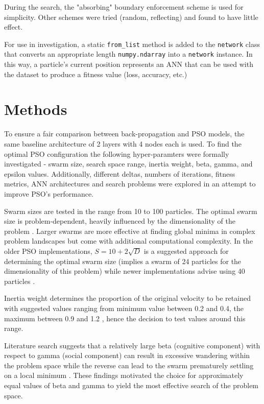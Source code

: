 \documentclass[12pt]{article}
\begin{document}
During the search, the "absorbing" \cite{Chu} boundary enforcement scheme is used
for simplicity. Other schemes were tried (random, reflecting) and found to have
little effect.

For use in investigation, a static \texttt{from\_list} method is added to
the \texttt{network} class that converts an appropriate length \texttt{numpy.ndarray}
into a \texttt{network} instance. In this way, a particle's current position
represents an ANN that can be used with the dataset to produce a fitness value (loss, accuracy, etc.)


\vspace{-1.5em}
\section{Methods}
\vspace{-1.5em}

To ensure a fair comparison between back-propagation and PSO models, the same baseline architecture of 2 layers with 4 nodes each is used. To find the optimal PSO configuration the following hyper-paramters were formally investigated - swarm size, search space range, inertia weight, beta, gamma, and epsilon values. Additionally, different deltas, numbers of iterations, fitness metrics, ANN architectures and search problems were explored in an attempt to improve PSO's performance.

Swarm sizes are tested in the range from 10 to 100 particles. The optimal swarm size is problem-dependent, heavily influenced by the dimensionality of the problem \cite{Razee}. Larger swarms are more effective at finding global minima in complex problem landscapes but come with additional computational complexity. In the older PSO implementations, \(S = 10 + 2\sqrt{D}\) is a suggested approach for determining the optimal swarm size (implies a swarm of 24 particles for the dimensionality of this problem) while newer implementations advise using 40 particles \cite{Clerc}.

Inertia weight determines the proportion of the original velocity to be retained with suggested values ranging from minimum value between 0.2 and 0.4, the maximum between 0.9 and 1.2 \cite{Razee} \cite{Gudise}, hence the decision to test values around this range.

Literature search suggests that a relatively large beta (cognitive component) with respect to gamma (social component) can result in excessive wandering within the problem space while the reverse  can lead to the swarm prematurely settling on a local minimum \cite{Kennedy}. These findings motivated the choice for approximately equal values of beta and gamma to yield the most effective search of the problem space. 
\end{document}
